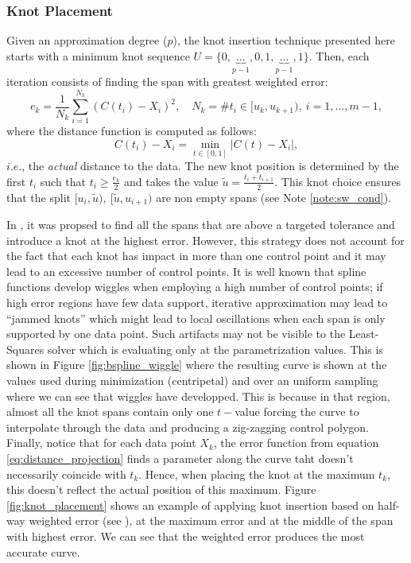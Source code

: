 \subsubsection{Knot Placement}\label{sec:knot_placment}
Given an approximation degree ($p$), 
the knot insertion technique presented here starts with a minimum knot sequence
$U=\{0,\underbrace{\ldots}_{p-1},0,1,\underbrace{\ldots}_{p-1},1\}$.
%
Then, each iteration consists of finding the span with greatest weighted error: 
 $$e_k = \frac{1}{N_k}\sum_{i=1}^{N_k} (C(t_i) - X_i)^2,\quad N_k = \# t_i\in [u_k, u_{k+1}),\ i=1,\ldots,m-1, $$
 where the distance function is computed as follows:
 \begin{equation}\label{eq:distance_projection}
  C(t_i) - X_i = \min_{t\in[0,1]} |C(t) -  X_i|,
 \end{equation}
$i.e.$, the \emph{actual} distance to the data. The new knot position is determined by
 the first $t_i$ such that $t_i \geq \frac{e_k}{2}$ and takes
 the value $\tilde u = \frac{t_i+t_{i+1}}{2}$. 
 This knot choice ensures that the split $[u_i, \tilde u),\ [\tilde u,u_{i+1})$ are non empty spans 
 (see Note \ref{note:sw_cond}). 

 
 
 In \cite[Ch. ]{nurbs_book}, 
 it was propsed to find all the spans that are above a targeted tolerance and introduce a knot at the highest error. 
 However, this strategy does not account  
 for the fact that each knot has impact in more than one control point and it may lead to an excessive number
  of control points. It is well known that spline functions develop wiggles when employing a high number of control points; 
   if high error regions have few data support, iterative approximation may lead to ``jammed knots'' which might lead to local oscillations
   when each span is only supported by one data point. Such artifacts may not be visible to the Least-Squares solver 
   which is evaluating only at the parametrization values. This is shown in Figure \ref{fig:bspline_wiggle} where the resulting curve is shown at the values used during minimization (centripetal) 
and over an uniform sampling where we can see that wiggles have developped. This is because in that region, almost all the 
 knot spans contain only one $t-$value forcing the curve to interpolate through the data and producing a zig-zagging control polygon. 
   Finally, notice that for each data point $X_k$, 
   the error function from equation \eqref{eq:distance_projection} finds a parameter along the curve 
    taht doesn't necessarily coincide with $t_k$. Hence, when placing the knot at the maximum $t_k$, this doesn't reflect the actual position of this maximum. 
    Figure \ref{fig:knot_placement} shows an example of applying knot insertion based on half-way weighted error (see ), at the maximum error and at the middle of the span with 
    highest error. We can see that the weighted error produces the most accurate curve.  
 
